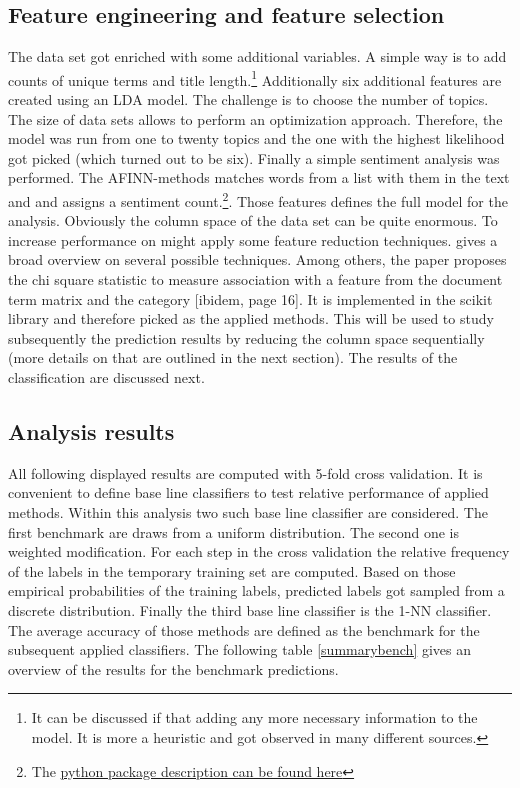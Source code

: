 \documentclass[12pt,a4paper,bibliography=totocnumbered,listof=totocnumbered]{scrartcl}
\begin{document}
\subsection{Feature engineering and feature selection}

The data set got enriched with some additional variables. A simple way is to add counts of unique terms and title length.\footnote{It can be discussed if that adding any more necessary information to the model. It is more a heuristic and got observed in many different sources.} Additionally six additional features are created using an LDA model. The challenge is to choose the number of topics. The size of data sets allows to perform an optimization approach. Therefore, the model was run from one to twenty topics and the one with the highest likelihood got picked (which turned out to be six). Finally a simple sentiment analysis was performed. The AFINN-methods matches words from a list with them in the text and and assigns a sentiment count.\footnote{The \href{https://pypi.python.org/pypi/afinn/0.0.1rc1}{python package description can be found here}}. Those features defines the full model for the analysis.
Obviously the column space of the data set can be quite enormous. To increase performance on might apply some feature reduction techniques. \cite{Divya2015} gives a broad overview on several possible techniques. Among others, the paper proposes the chi square statistic to measure association with a feature from the document term matrix and the category [ibidem, page 16]. It is implemented in the scikit library and therefore  picked as the applied methods. 
This will be used to study subsequently the prediction results by reducing the column space sequentially (more details on that are outlined in the next section). The results of the classification are discussed next.

\subsection{Analysis results}

All following displayed results are computed with 5-fold cross validation. It is convenient to define base line classifiers to test relative performance of applied methods. Within this analysis two such base line classifier are considered. The first benchmark are draws from a uniform distribution. The second one is weighted modification. For each step in the cross validation the relative frequency of the labels in the temporary training set are computed. Based on those empirical probabilities of the training labels, predicted labels got sampled from a discrete distribution. Finally the third base line classifier is the 1-NN classifier. The average accuracy of those methods are defined as the benchmark for the subsequent applied classifiers. The following table \ref{summarybench} gives an overview of the results for the benchmark predictions.
\end{document}
